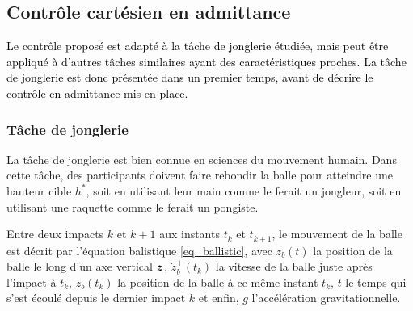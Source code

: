 %
%
%

\subsection{Contrôle cartésien en admittance} \label{chap2_sec_ctrl_vfo_subsec_cartesian}

\textcolor{black}{Le contrôle proposé est adapté à la tâche de jonglerie étudiée, mais peut être appliqué à d'autres tâches similaires ayant des caractéristiques proches. La tâche de jonglerie est donc présentée dans un premier temps, avant de décrire le contrôle en admittance mis en place.}


\subsubsection{Tâche de jonglerie} \label{chap2_sec_ctrl_vfo_subsec_cartesian_0}

La tâche de jonglerie est bien connue en sciences du mouvement humain. Dans cette tâche, des participants doivent faire rebondir la balle pour atteindre une hauteur cible $h^*$, soit en utilisant leur main comme le ferait un jongleur, soit en utilisant une raquette comme le ferait un pongiste. 

\tikzexternalenable

\tikzexternaldisable

Entre deux impacts $k$ et $k+1$ aux instants $t_k$ et $t_{k+1}$, le mouvement de la balle est décrit par l'équation balistique \cref{eq_ballistic}, avec $ z_b(t) $ la position de la balle le long d'un axe vertical $ \vect{z} $, $ \dot{z}_b^+(t_k) $ la vitesse de la balle juste après l'impact à $t_k$, $ z_b(t_k) $ la position de la balle à ce même instant $t_k$, $ t $ le temps qui s'est écoulé depuis le dernier impact $k$ et enfin, $g$ l'accélération gravitationnelle. 

